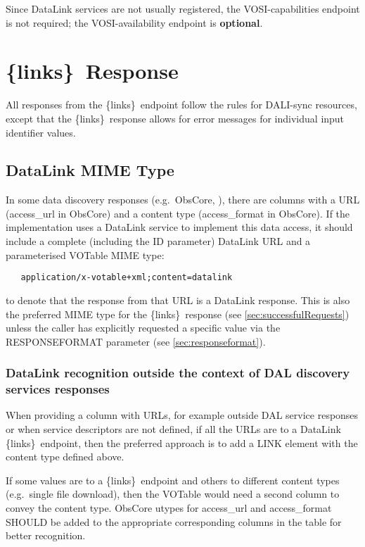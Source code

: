 \documentclass[11pt,a4paper]{ivoa}
\newcommand{\blinks}{\{links\}}
\newcommand{\rfcoptional}{\textbf{optional}}
\begin{document}
Since DataLink services are not usually registered, the VOSI-capabilities endpoint
is not required; the VOSI-availability endpoint is \rfcoptional.

\section{\blinks\ Response}

All responses from the \blinks\ endpoint follow the rules for DALI-sync
resources, except that the \blinks\ response allows for error
messages for individual input identifier values.


\subsection{DataLink MIME Type}
\label{sec:mime}

In some data discovery responses (e.g.\ ObsCore, \citet{2017ivoa.spec.0509L}),
there are columns
with a URL (access\_url in ObsCore) and a content type (access\_format in
ObsCore). If the implementation uses a DataLink service to implement this
data access, it should include a complete (including the ID parameter)
DataLink URL and a parameterised VOTable MIME type:
\begin{verbatim}
   application/x-votable+xml;content=datalink
\end{verbatim}
to denote that the response from that URL is a DataLink response.
This is also the preferred MIME type for the \blinks\ response
(see \ref{sec:successfulRequests})
unless the caller has explicitly requested a specific value
via the RESPONSEFORMAT parameter (see \ref{sec:responseformat}).

\subsubsection{DataLink recognition outside the context
               of DAL discovery services responses}
\label{sec:columnsUrl}

When providing a column with URLs, for example outside DAL service
responses or when service descriptors  are not defined, if all the
URLs are to a DataLink \blinks\ endpoint, then the preferred approach
is to add a LINK element with the content type defined above.

If some values are to a \blinks\ endpoint and others to
different content types (e.g.\ single file download), then the VOTable
would need a second column to convey the content type.
ObsCore utypes for access\_url and access\_format SHOULD
be added to the appropriate corresponding columns in the table  for
better recognition.
\end{document}
